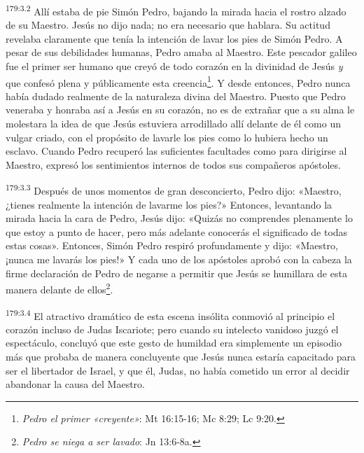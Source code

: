 \par 
\textsuperscript{179:3.2} Allí estaba de pie Simón Pedro, bajando la mirada hacia el rostro alzado de su Maestro. Jesús no dijo nada; no era necesario que hablara. Su actitud revelaba claramente que tenía la intención de lavar los pies de Simón Pedro. A pesar de sus debilidades humanas, Pedro amaba al Maestro. Este pescador galileo fue el primer ser humano que creyó de todo corazón en la divinidad de Jesús \textit{y} que confesó plena y públicamente esta creencia\footnote{\textit{Pedro el primer «creyente»}: Mt 16:15-16; Mc 8:29; Lc 9:20.}. Y desde entonces, Pedro nunca había dudado realmente de la naturaleza divina del Maestro. Puesto que Pedro veneraba y honraba así a Jesús en su corazón, no es de extrañar que a su alma le molestara la idea de que Jesús estuviera arrodillado allí delante de él como un vulgar criado, con el propósito de lavarle los pies como lo hubiera hecho un esclavo. Cuando Pedro recuperó las suficientes facultades como para dirigirse al Maestro, expresó los sentimientos internos de todos sus compañeros apóstoles.

\par 
\textsuperscript{179:3.3} Después de unos momentos de gran desconcierto, Pedro dijo: «Maestro, ¿tienes realmente la intención de lavarme los pies?» Entonces, levantando la mirada hacia la cara de Pedro, Jesús dijo: «Quizás no comprendes plenamente lo que estoy a punto de hacer, pero más adelante conocerás el significado de todas estas cosas». Entonces, Simón Pedro respiró profundamente y dijo: «Maestro, ¡nunca me lavarás los pies!» Y cada uno de los apóstoles aprobó con la cabeza la firme declaración de Pedro de negarse a permitir que Jesús se humillara de esta manera delante de ellos\footnote{\textit{Pedro se niega a ser lavado}: Jn 13:6-8a.}.

\par 
\textsuperscript{179:3.4} El atractivo dramático de esta escena insólita conmovió al principio el corazón incluso de Judas Iscariote; pero cuando su intelecto vanidoso juzgó el espectáculo, concluyó que este gesto de humildad era simplemente un episodio más que probaba de manera concluyente que Jesús nunca estaría capacitado para ser el libertador de Israel, y que él, Judas, no había cometido un error al decidir abandonar la causa del Maestro.

